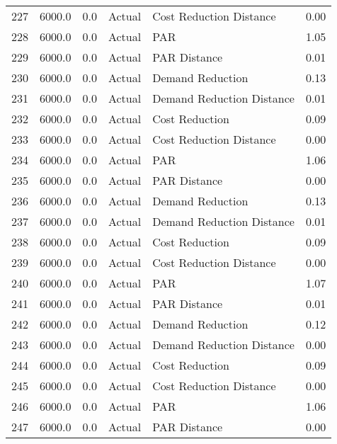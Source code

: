 \begin{longtable}{lrrllr}
227  &       6000.0 &     0.0 &         Actual &    Cost Reduction Distance &   0.00 \\
228  &       6000.0 &     0.0 &         Actual &                        PAR &   1.05 \\
229  &       6000.0 &     0.0 &         Actual &               PAR Distance &   0.01 \\
230  &       6000.0 &     0.0 &         Actual &           Demand Reduction &   0.13 \\
231  &       6000.0 &     0.0 &         Actual &  Demand Reduction Distance &   0.01 \\
232  &       6000.0 &     0.0 &         Actual &             Cost Reduction &   0.09 \\
233  &       6000.0 &     0.0 &         Actual &    Cost Reduction Distance &   0.00 \\
234  &       6000.0 &     0.0 &         Actual &                        PAR &   1.06 \\
235  &       6000.0 &     0.0 &         Actual &               PAR Distance &   0.00 \\
236  &       6000.0 &     0.0 &         Actual &           Demand Reduction &   0.13 \\
237  &       6000.0 &     0.0 &         Actual &  Demand Reduction Distance &   0.01 \\
238  &       6000.0 &     0.0 &         Actual &             Cost Reduction &   0.09 \\
239  &       6000.0 &     0.0 &         Actual &    Cost Reduction Distance &   0.00 \\
240  &       6000.0 &     0.0 &         Actual &                        PAR &   1.07 \\
241  &       6000.0 &     0.0 &         Actual &               PAR Distance &   0.01 \\
242  &       6000.0 &     0.0 &         Actual &           Demand Reduction &   0.12 \\
243  &       6000.0 &     0.0 &         Actual &  Demand Reduction Distance &   0.00 \\
244  &       6000.0 &     0.0 &         Actual &             Cost Reduction &   0.09 \\
245  &       6000.0 &     0.0 &         Actual &    Cost Reduction Distance &   0.00 \\
246  &       6000.0 &     0.0 &         Actual &                        PAR &   1.06 \\
247  &       6000.0 &     0.0 &         Actual &               PAR Distance &   0.00 \\

\end{longtable}
